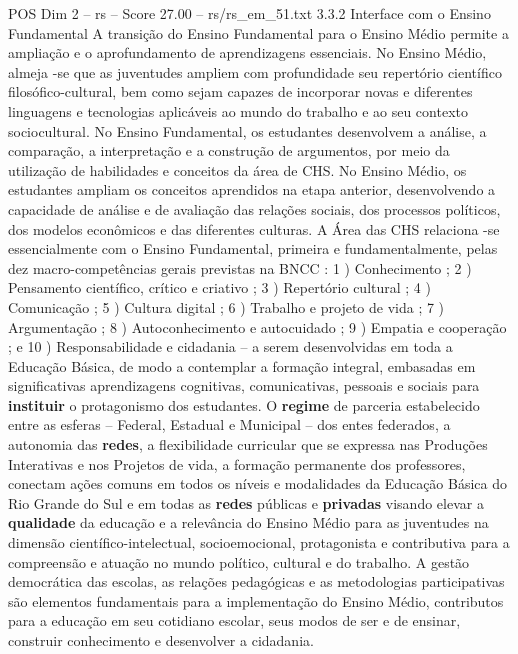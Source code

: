 \begin{textsample}{POS Dim 2 – rs – Score 27.00 – rs/rs\_em\_51.txt}  \label{ex:f2_pos_077}
3.3.2 Interface com o Ensino Fundamental A transição do Ensino Fundamental para o Ensino Médio permite a ampliação e o aprofundamento de aprendizagens essenciais.
No Ensino Médio, almeja -se que as juventudes ampliem com profundidade seu repertório científico filosófico-cultural, bem como sejam capazes de incorporar novas e diferentes linguagens e tecnologias aplicáveis ao mundo do trabalho e ao seu contexto sociocultural.
No Ensino Fundamental, os estudantes desenvolvem a análise, a comparação, a interpretação e a construção de argumentos, por meio da utilização de habilidades e conceitos da área de CHS.
No Ensino Médio, os estudantes ampliam os conceitos aprendidos na etapa anterior, desenvolvendo a capacidade de análise e de avaliação das relações sociais, dos processos políticos, dos modelos econômicos e das diferentes culturas.
A Área das CHS relaciona -se essencialmente com o Ensino Fundamental, primeira e fundamentalmente, pelas dez macro-competências gerais previstas na BNCC : 1 ) Conhecimento ; 2 ) Pensamento científico, crítico e criativo ; 3 ) Repertório cultural ; 4 ) Comunicação ; 5 ) Cultura digital ; 6 ) Trabalho e projeto de vida ; 7 ) Argumentação ; 8 ) Autoconhecimento e autocuidado ; 9 ) Empatia e cooperação ; e 10 ) Responsabilidade e cidadania – a serem desenvolvidas em toda a Educação Básica, de modo a contemplar a formação integral, embasadas em significativas aprendizagens cognitivas, comunicativas, pessoais e sociais para \textbf{instituir} o protagonismo dos estudantes.
O \textbf{regime} de parceria estabelecido entre as esferas – Federal, Estadual e Municipal – dos entes federados, a autonomia das \textbf{redes}, a flexibilidade curricular que se expressa nas Produções Interativas e nos Projetos de vida, a formação permanente dos professores, conectam ações comuns em todos os níveis e modalidades da Educação Básica do Rio Grande do Sul e em todas as \textbf{redes} públicas e \textbf{privadas} visando elevar a \textbf{qualidade} da educação e a relevância do Ensino Médio para as juventudes na dimensão científico-intelectual, socioemocional, protagonista e contributiva para a compreensão e atuação no mundo político, cultural e do trabalho.
A gestão democrática das escolas, as relações pedagógicas e as metodologias participativas são elementos fundamentais para a implementação do Ensino Médio, contributos para a educação em seu cotidiano escolar, seus modos de ser e de ensinar, construir conhecimento e desenvolver a cidadania.

\end{textsample}
